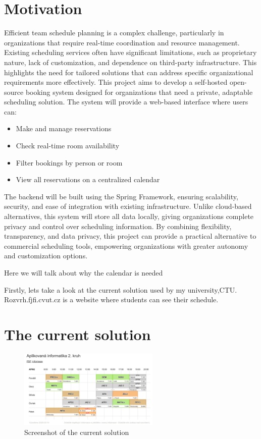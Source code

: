 \section*{Motivation}
Efficient team schedule planning is a complex challenge, particularly in organizations that require real-time coordination and resource management.
Existing scheduling services often have significant limitations, such as proprietary nature, lack of customization, and dependence on third-party infrastructure.
This highlights the need for tailored solutions that can address specific organizational requirements more effectively.
This project aims to develop a self-hosted open-source booking system designed for organizations that need a private, adaptable scheduling solution.
The system will provide a web-based interface where users can:
\begin{itemize}
    \item Make and manage reservations
    \item Check real-time room availability
    \item  Filter bookings by person or room
    \item View all reservations on a centralized calendar
\end{itemize}

The backend will be built using the Spring Framework, ensuring scalability, security, and ease of integration with existing infrastructure.
Unlike cloud-based alternatives, this system will store all data locally, giving organizations complete privacy and control over scheduling information.
By combining flexibility, transparency, and data privacy, this project can provide a practical alternative to commercial scheduling tools, empowering organizations with greater autonomy and customization options.


\pagestyle{headings}
Here we will talk about why the calendar is needed

Firstly, lets take a look at the current solution used by my university,CTU. Rozvrh.fjfi.cvut.cz is a website where students can see their schedule.
\section{The current solution}\label{sec:the-current-solution}
\begin{figure}[h]
  \centering
  \includegraphics[width=0.6\textwidth]{img}
  \caption{Screenshot of the current solution}
  \label{fig:rozvrh}
\end{figure}

